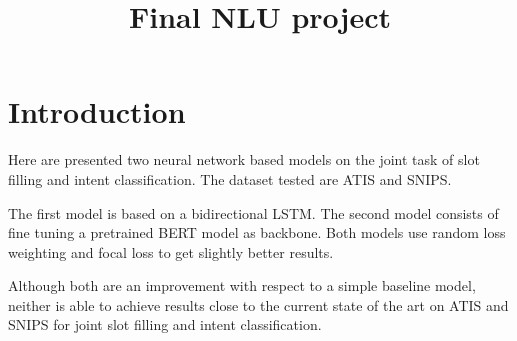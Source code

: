 \documentclass[a4paper]{article}
\title{Final NLU project}
\begin{document}
\maketitle


\section{Introduction}
    Here are presented two neural network based models on the joint task of slot filling and intent classification. The dataset tested are ATIS and SNIPS.
    
    The first model is based on a bidirectional LSTM. 
    The second model consists of fine tuning a pretrained BERT model as backbone.
    Both models use random loss weighting and focal loss to get slightly better results.
    
    Although both are an improvement with respect to a simple baseline model, neither is able to achieve results close to the current state of the art on ATIS and SNIPS for joint slot filling and intent classification. 
        
    
\end{document}
